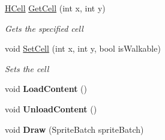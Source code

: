 \begin{DoxyCompactItemize}
\hyperlink{class_hel_project_1_1_game_world_1_1_map_1_1_h_cell}{H\+Cell} \hyperlink{class_hel_project_1_1_game_world_1_1_map_1_1_h_map_add08dfb4ddb7dec19bd52684e6051da2}{Get\+Cell} (int x, int y)
\begin{DoxyCompactList}\small\item\em Gets the specified cell \end{DoxyCompactList}\item 
void \hyperlink{class_hel_project_1_1_game_world_1_1_map_1_1_h_map_ac2ef04c6930b46bea691379183ca57f4}{Set\+Cell} (int x, int y, bool is\+Walkable)
\begin{DoxyCompactList}\small\item\em Sets the cell \end{DoxyCompactList}\item 
\hypertarget{class_hel_project_1_1_game_world_1_1_map_1_1_h_map_aba4e4fe6ef1061980b0899b5bdf9a288}{}void {\bfseries Load\+Content} ()\label{class_hel_project_1_1_game_world_1_1_map_1_1_h_map_aba4e4fe6ef1061980b0899b5bdf9a288}

\item 
\hypertarget{class_hel_project_1_1_game_world_1_1_map_1_1_h_map_a83dff5b5aecb9907e9ae2e78d6c115f3}{}void {\bfseries Unload\+Content} ()\label{class_hel_project_1_1_game_world_1_1_map_1_1_h_map_a83dff5b5aecb9907e9ae2e78d6c115f3}

\item 
\hypertarget{class_hel_project_1_1_game_world_1_1_map_1_1_h_map_a8c37ac963414a500a32cd188b536209b}{}void {\bfseries Draw} (Sprite\+Batch sprite\+Batch)\label{class_hel_project_1_1_game_world_1_1_map_1_1_h_map_a8c37ac963414a500a32cd188b536209b}

\end{DoxyCompactItemize}
